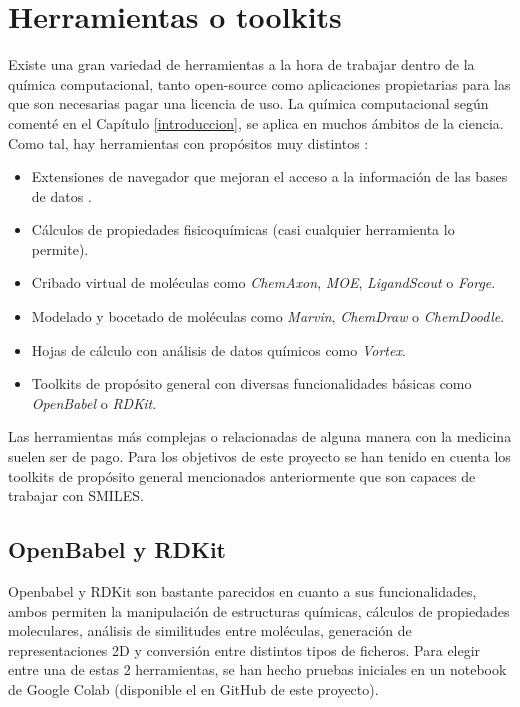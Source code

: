 \section{Herramientas o toolkits} \label{toolkits}

Existe una gran variedad de herramientas a la hora de trabajar dentro de la química computacional, tanto open-source como aplicaciones propietarias para las que son necesarias pagar una licencia de uso. La química computacional según comenté en el Capítulo \ref{introduccion}, se aplica en muchos ámbitos de la ciencia. Como tal, hay herramientas con propósitos muy distintos \cite{toolkits_recap}: 
\begin{itemize}
    \item Extensiones de navegador que mejoran el acceso a la información de las bases de datos \cite{safari_extensions}.
    \item Cálculos de propiedades fisicoquímicas (casi cualquier herramienta lo permite).
    \item Cribado virtual de moléculas como \textit{ChemAxon}, \textit{MOE}, \textit{LigandScout} o \textit{Forge}.
    \item Modelado y bocetado de moléculas como \textit{Marvin}, \textit{ChemDraw} o \textit{ChemDoodle}.
    \item Hojas de cálculo con análisis de datos químicos como \textit{Vortex}.
    \item Toolkits de propósito general con diversas funcionalidades básicas como \textit{OpenBabel} o \textit{RDKit}.
\end{itemize}
Las herramientas más complejas o relacionadas de alguna manera con la medicina suelen ser de pago. Para los objetivos de este proyecto se han tenido en cuenta los toolkits de propósito general mencionados anteriormente que son capaces de trabajar con SMILES.

\subsection{OpenBabel y RDKit}

Openbabel y RDKit son bastante parecidos en cuanto a sus funcionalidades, ambos permiten la manipulación de estructuras químicas, cálculos de propiedades moleculares, análisis de similitudes entre moléculas, generación de representaciones 2D y conversión entre distintos tipos de ficheros. Para elegir entre una de estas 2 herramientas, se han hecho pruebas iniciales en un notebook de Google Colab \cite{google_colab} (disponible el en GitHub de este proyecto).


